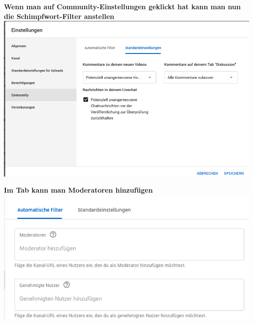 \newpage
{}
\begin{center}
  \textbf{Wenn man auf Community-Einstellungen geklickt hat kann man nun die Schimpfwort-Filter anstellen} \\
  {\vspace{0.3cm}}
  \includegraphics[width=\textwidth]{./pictures/premiere10.png}
\end{center}

\begin{center}
  \textbf{Im Tab  kann man Moderatoren hinzufügen} \\
  {\vspace{0.3cm}}
  \includegraphics[width=\textwidth]{./pictures/premiere9.png}
\end{center}
\newpage



